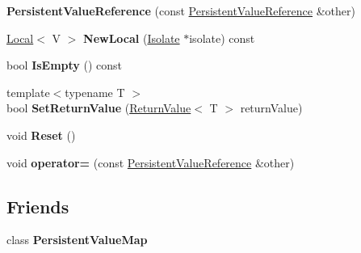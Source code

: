 \begin{DoxyCompactItemize}
\item 
\hypertarget{classv8_1_1PersistentValueMap_1_1PersistentValueReference_a1a4638469ba0a5901036d69a1483f7c6}{}{\bfseries Persistent\+Value\+Reference} (const \hyperlink{classv8_1_1PersistentValueMap_1_1PersistentValueReference}{Persistent\+Value\+Reference} \&other)\label{classv8_1_1PersistentValueMap_1_1PersistentValueReference_a1a4638469ba0a5901036d69a1483f7c6}

\item 
\hypertarget{classv8_1_1PersistentValueMap_1_1PersistentValueReference_a21dfb12fb2c0e572ac796ac1d7d8d01d}{}\hyperlink{classv8_1_1Local}{Local}$<$ V $>$ {\bfseries New\+Local} (\hyperlink{classv8_1_1Isolate}{Isolate} $\ast$isolate) const \label{classv8_1_1PersistentValueMap_1_1PersistentValueReference_a21dfb12fb2c0e572ac796ac1d7d8d01d}

\item 
\hypertarget{classv8_1_1PersistentValueMap_1_1PersistentValueReference_a5d0180c813aad9ab87e2342c051c197e}{}bool {\bfseries Is\+Empty} () const \label{classv8_1_1PersistentValueMap_1_1PersistentValueReference_a5d0180c813aad9ab87e2342c051c197e}

\item 
\hypertarget{classv8_1_1PersistentValueMap_1_1PersistentValueReference_a19b4ed2902914b03f1fbb8310642e748}{}{\footnotesize template$<$typename T $>$ }\\bool {\bfseries Set\+Return\+Value} (\hyperlink{classv8_1_1ReturnValue}{Return\+Value}$<$ T $>$ return\+Value)\label{classv8_1_1PersistentValueMap_1_1PersistentValueReference_a19b4ed2902914b03f1fbb8310642e748}

\item 
\hypertarget{classv8_1_1PersistentValueMap_1_1PersistentValueReference_a898bc6699311170a785884477ce109a1}{}void {\bfseries Reset} ()\label{classv8_1_1PersistentValueMap_1_1PersistentValueReference_a898bc6699311170a785884477ce109a1}

\item 
\hypertarget{classv8_1_1PersistentValueMap_1_1PersistentValueReference_a4e38453a562f60e43fa553d3666c5ec3}{}void {\bfseries operator=} (const \hyperlink{classv8_1_1PersistentValueMap_1_1PersistentValueReference}{Persistent\+Value\+Reference} \&other)\label{classv8_1_1PersistentValueMap_1_1PersistentValueReference_a4e38453a562f60e43fa553d3666c5ec3}

\end{DoxyCompactItemize}
\subsection*{Friends}
\begin{DoxyCompactItemize}
\item 
\hypertarget{classv8_1_1PersistentValueMap_1_1PersistentValueReference_aa96af8a34f1f35df272c683a483162da}{}class {\bfseries Persistent\+Value\+Map}\label{classv8_1_1PersistentValueMap_1_1PersistentValueReference_aa96af8a34f1f35df272c683a483162da}

\end{DoxyCompactItemize}


